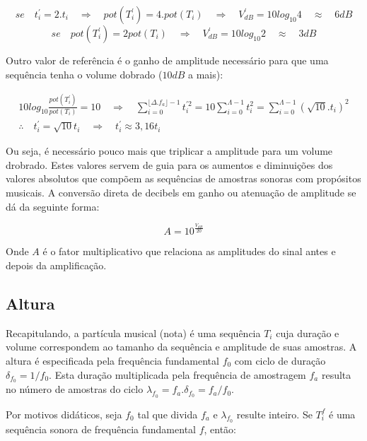 \begin{equation}\label{eq:ampVol}
se \quad  t_i^{'}=2 . t_i \quad \Rightarrow \quad pot(T^{'}_i)=4 . pot(T_i) \quad \Rightarrow \quad V^{'}_{dB}=10log_{10} 4 \quad  \approx \quad 6 dB
\end{equation}
\begin{equation}
se \quad pot(T^{'}_i)=2 pot(T_i) \quad \Rightarrow \quad V^{'}_{dB}=10log_{10} 2 \quad \approx \quad 3 dB
\end{equation}

Outro valor de referência é o ganho de amplitude
necessário para que uma sequência tenha o volume dobrado ($10dB$ a mais):

\begin{gather}
10log_{10}\frac{pot(T^{'}_i)}{pot(T_i)} = 10 \quad \Rightarrow \quad \sum_{i=0}^{\lfloor \Delta.f_a \rfloor -1}t^{'2}_i=10\sum_{i=0}^{\Lambda-1}t_i^2=\sum_{i=0}^{\Lambda-1}(\sqrt{10}.t_i)^2 \\
\therefore \quad t^{'}_i=\sqrt{10}t_i \quad \Rightarrow \quad t^{'}_i \approx 3,16t_i
\end{gather}

Ou seja, é necessário pouco mais que triplicar a amplitude para um volume drobrado.
Estes valores servem de guia para os aumentos e diminuições dos valores absolutos que compõem as
sequências de amostras sonoras com propósitos musicais. A conversão direta de decibels
em ganho ou atenuação de amplitude se dá da seguinte forma:

\begin{equation}\label{ampDec}
A = 10^{\frac{V_{dB}}{20}}
\end{equation}

Onde $A$ é o fator multiplicativo que relaciona as amplitudes do sinal antes e depois da amplificação.

\subsection{Altura}

Recapitulando, a partícula musical (nota) é uma sequência $T_i$ cuja duração e volume correspondem ao tamanho da sequência e amplitude de suas amostras. A altura é especificada pela frequência fundamental $f_0$ com ciclo de duração $\delta_{f_0} = 1/f_0$. Esta duração multiplicada pela frequência de amostragem $f_a$ resulta no número de amostras
do ciclo $\lambda_{f_0}=f_a . \delta_{f_0} =f_a/f_0$.

Por motivos didáticos, seja $f_0$ tal que divida $f_a$ e $\lambda_{f_0}$ resulte inteiro.
Se $T_i^f$ é uma sequência sonora de frequência fundamental $f$, então:
    
